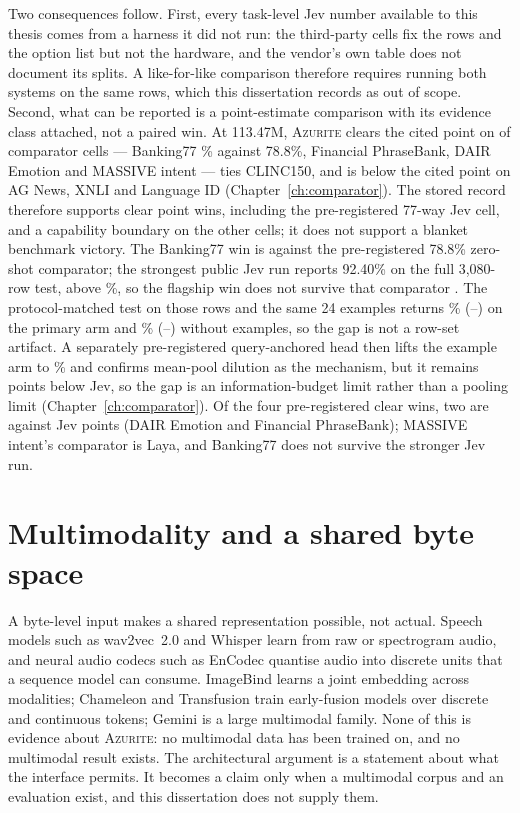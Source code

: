 Two consequences follow. First, every task-level Jev number available to this
thesis comes from a harness it did not run: the third-party cells fix the rows and
the option list but not the hardware, and the vendor's own table does not document
its splits. A like-for-like comparison therefore requires running both systems on
the same rows, which this dissertation records as out of scope. Second, what can
be reported is a point-estimate comparison with its evidence class attached, not a
paired win. At 113.47M, \textsc{Azurite} clears the cited point on \SuiteLargeClear{} of
\SuiteComparatorCells{} comparator cells --- Banking77 \SuiteLargeBank\% against
78.8\%, Financial PhraseBank, DAIR Emotion and MASSIVE intent --- ties CLINC150,
and is below the cited point on AG News, XNLI and Language ID
(Chapter~\ref{ch:comparator}). The stored record therefore supports clear point
wins, including the pre-registered 77-way Jev cell, and a capability boundary on
the other cells; it does not support a blanket benchmark victory. The Banking77
win is against the pre-registered 78.8\% zero-shot comparator; the strongest
public Jev run reports 92.40\% on the full 3,080-row test, above
\SuiteLargeBank\%, so the flagship win does not survive that comparator
\citep{smith2026jevbanking}. The protocol-matched test on those rows and the
same 24 examples returns \JevMatchPctAOne\% (\JevMatchAOneLo--\JevMatchAOneHi)
on the primary arm and \JevMatchPctNoEx\% (\JevMatchNoExLo--\JevMatchNoExHi)
without examples, so the gap is not a row-set artifact. A separately
pre-registered query-anchored head then lifts the example arm to
\QueryPctQueryTwo\% and confirms mean-pool dilution as the mechanism, but it
remains \QueryDiffAbs{} points below Jev, so the gap is an information-budget
limit rather than a pooling limit (Chapter~\ref{ch:comparator}). Of the four
pre-registered clear wins, two are against Jev points (DAIR Emotion and
Financial PhraseBank); MASSIVE intent's comparator is Laya, and Banking77 does
not survive the stronger Jev run.

\section{Multimodality and a shared byte space}

A byte-level input makes a shared representation possible, not actual. Speech
models such as wav2vec~2.0 \citep{baevski2020wav2vec} and Whisper
\citep{radford2022whisper} learn from raw or spectrogram audio, and neural audio
codecs such as EnCodec \citep{defossez2022encodec} quantise audio into discrete
units that a sequence model can consume. ImageBind \citep{girdhar2023imagebind}
learns a joint embedding across modalities; Chameleon \citep{chameleon2024} and
Transfusion \citep{zhou2024transfusion} train early-fusion models over discrete
and continuous tokens; Gemini \citep{gemini2023} is a large multimodal family.
None of this is evidence about \textsc{Azurite}: no multimodal data has been
trained on, and no multimodal result exists. The architectural argument is a
statement about what the interface permits. It becomes a claim only when a
multimodal corpus and an evaluation exist, and this dissertation does not supply
them.


